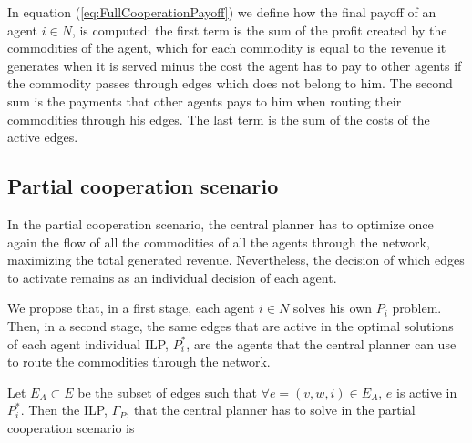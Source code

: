 \documentclass[review]{elsarticle}
\begin{document}
In equation (\ref{eq:FullCooperationPayoff}) we define how the final payoff of an agent $i\in N$, is computed: the first term is the sum of the profit created by the commodities of the agent, which for each commodity is equal to the revenue it
generates when it is served minus the cost the agent has to pay to other agents
if the commodity passes through edges which does not belong to him. The second
sum is the payments that other agents pays to him when routing their commodities
through his edges. The last term is the sum of the costs of the active edges.


\subsection{Partial cooperation scenario}

In the partial cooperation scenario, the central planner has to optimize once
again the flow of all the commodities of all the agents through the network,
maximizing the total generated revenue. Nevertheless, the decision of which
edges to activate remains as an individual decision of each agent.


We propose that, in a first stage, each agent $i \in N$ solves his own $P_i$ problem. Then, in a second stage, the same edges that are active in the optimal solutions of each agent individual ILP, $P_i^*$, are the agents that the central planner can use to route the commodities through the network.

Let $E_A \subset E$ be the subset of edges such that $\forall e=(v,w,i) \in
E_A$, $e$ is active in $P_i^*$. Then the ILP, $\Gamma_P$, that the central planner has to solve in the partial cooperation scenario is
\end{document}
